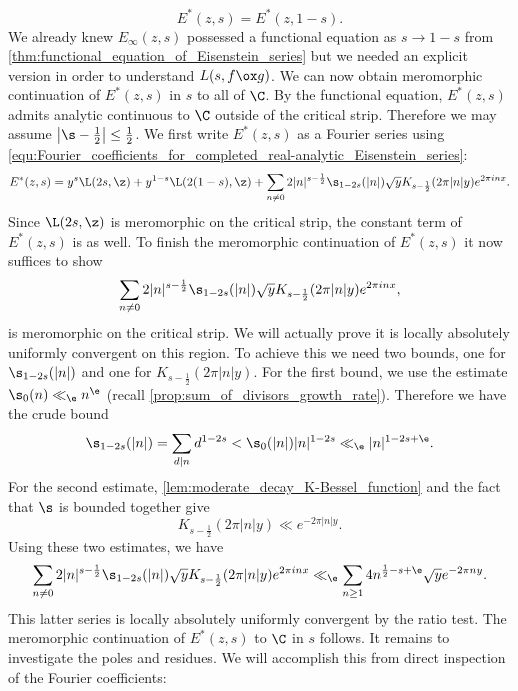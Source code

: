      \[
        E^{\ast}(z,s) = E^{\ast}(z,1-s).
      \]
      We already knew $E_{\infty}(z,s)$ possessed a functional equation as $s \to 1-s$ from \cref{thm:functional_equation_of_Eisenstein_series} but we needed an explicit version in order to understand $L(s,f \ox g)$. We can now obtain meromorphic continuation of $E^{\ast}(z,s)$ in $s$ to all of $\C$. By the functional equation, $E^{\ast}(z,s)$ admits analytic continuous to $\C$ outside of the critical strip. Therefore we may assume $\left|\s-\frac{1}{2}\right| \le \frac{1}{2}$. We first write $E^{\ast}(z,s)$ as a Fourier series using \cref{equ:Fourier_coefficients_for_completed_real-analytic_Eisenstein_series}:
      \[
        E^{\ast}(z,s) = y^{s}\L(2s,\z)+y^{1-s}\L(2(1-s),\z)+\sum_{n \neq 0}2|n|^{s-\frac{1}{2}}\s_{1-2s}(|n|)\sqrt{y}K_{s-\frac{1}{2}}(2\pi|n|y)e^{2\pi inx}.
      \]
      Since $\L(2s,\z)$ is meromorphic on the critical strip, the constant term of $E^{\ast}(z,s)$ is as well. To finish the meromorphic continuation of $E^{\ast}(z,s)$ it now suffices to show
      \[
        \sum_{n \neq 0}2|n|^{s-\frac{1}{2}}\s_{1-2s}(|n|)\sqrt{y}K_{s-\frac{1}{2}}(2\pi|n|y)e^{2\pi inx},
      \]
      is meromorphic on the critical strip. We will actually prove it is locally absolutely uniformly convergent on this region. To achieve this we need two bounds, one for $\s_{1-2s}(|n|)$ and one for $K_{s-\frac{1}{2}}(2\pi|n|y)$. For the first bound, we use the estimate $\s_{0}(n) \ll_{\e} n^{\e}$ (recall \cref{prop:sum_of_divisors_growth_rate}). Therefore we have the crude bound
      \[
        \s_{1-2s}(|n|) = \sum_{d \mid n}d^{1-2s} < \s_{0}(|n|)|n|^{1-2s} \ll_{\e}|n|^{1-2s+\e}.
      \]
      For the second estimate, \cref{lem:moderate_decay_K-Bessel_function} and the fact that $\s$ is bounded together give
      \[
        K_{s-\frac{1}{2}}(2\pi|n|y) \ll e^{-2\pi|n|y}.
      \]
      Using these two estimates, we have
      \begin{equation}\label{equ:non-constant_Fourier_coefficient_bound_non-holomorphic_Eisenstein_series}
        \sum_{n \neq 0}2|n|^{s-\frac{1}{2}}\s_{1-2s}(|n|)\sqrt{y}K_{s-\frac{1}{2}}(2\pi|n|y)e^{2\pi inx} \ll_{\e} \sum_{n \ge 1}4n^{\frac{1}{2}-s+\e}\sqrt{y}e^{-2\pi ny}.
      \end{equation}
      This latter series is locally absolutely uniformly convergent by the ratio test. The meromorphic continuation of $E^{\ast}(z,s)$ to $\C$ in $s$ follows. It remains to investigate the poles and residues. We will accomplish this from direct inspection of the Fourier coefficients:

